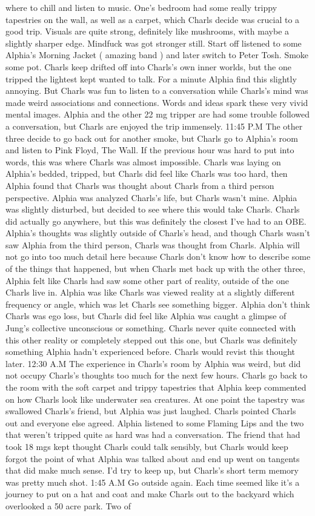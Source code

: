 \documentclass[12pt]{book}
\begin{document}
where to chill and listen to music. One's bedroom had some really trippy tapestries on the wall, as well as a carpet, which Charls decide was crucial to a good trip. Visuals are quite strong, definitely like mushrooms, with maybe a slightly sharper edge. Mindfuck was got stronger still. Start off listened to some Alphia's Morning Jacket ( amazing band ) and later switch to Peter Tosh. Smoke some pot. Charls keep drifted off into Charls's own inner worlds, but the one tripped the lightest kept wanted to talk. For a minute Alphia find this slightly annoying. But Charls was fun to listen to a conversation while Charls's mind was made weird associations and connections. Words and ideas spark these very vivid mental images. Alphia and the other 22 mg tripper are had some trouble followed a conversation, but Charls are enjoyed the trip immensely. 11:45 P.M The other three decide to go back out for another smoke, but Charls go to Alphia's room and listen to Pink Floyd, The Wall. If the previous hour was hard to put into words, this was where Charls was almost impossible. Charls was laying on Alphia's bedded, tripped, but Charls did feel like Charls was too hard, then Alphia found that Charls was thought about Charls from a third person perspective. Alphia was analyzed Charls's life, but Charls wasn't mine. Alphia was slightly disturbed, but decided to see where this would take Charls. Charls did actually go anywhere, but this was definitely the closest I've had to an OBE. Alphia's thoughts was slightly outside of Charls's head, and though Charls wasn't saw Alphia from the third person, Charls was thought from Charls. Alphia will not go into too much detail here because Charls don't know how to describe some of the things that happened, but when Charls met back up with the other three, Alphia felt like Charls had saw some other part of reality, outside of the one Charls live in. Alphia was like Charls was viewed reality at a slightly different frequency or angle, which was let Charls see something bigger. Alphia don't think Charls was ego loss, but Charls did feel like Alphia was caught a glimpse of Jung's collective unconscious or something. Charls never quite connected with this other reality or completely stepped out this one, but Charls was definitely something Alphia hadn't experienced before. Charls would revist this thought later. 12:30 A.M The experience in Charls's room by Alphia was weird, but did not occupy Charls's thoughts too much for the next few hours. Charls go back to the room with the soft carpet and trippy tapestries that Alphia keep commented on how Charls look like underwater sea creatures. At one point the tapestry was swallowed Charls's friend, but Alphia was just laughed. Charls pointed Charls out and everyone else agreed. Alphia listened to some Flaming Lips and the two that weren't tripped quite as hard was had a conversation. The friend that had took 18 mgs kept thought Charls could talk sensibly, but Charls would keep forgot the point of what Alphia was talked about and end up went on tangents that did make much sense. I'd try to keep up, but Charls's short term memory was pretty much shot. 1:45 A.M Go outside again. Each time seemed like it's a journey to put on a hat and coat and make Charls out to the backyard which overlooked a 50 acre park. Two of 
\end{document}
